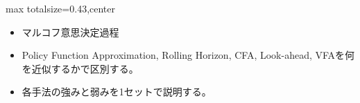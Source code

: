 \clearpage
{}
\begin{minipage}[t]{0.405\textwidth}
\begin{adjustbox}{max totalsize={\textwidth}{0.43\textheight},center}
\begin{minipage}{\textwidth}\scriptsize
{}\begin{itemize}
\item マルコフ意思決定過程
\end{itemize}\begin{itemize}
\item Policy Function Approximation, Rolling Horizon, CFA, Look-ahead, VFAを何を近似するかで区別する。
\item 各手法の強みと弱みを1セットで説明する。
\end{itemize}
\end{minipage}
\end{adjustbox}
\end{minipage}\hfill
